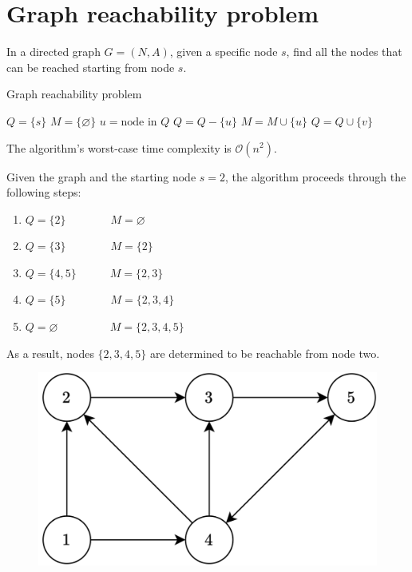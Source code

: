 \section{Graph reachability problem}

In a directed graph $G=(N,A)$, given a specific node $s$, find all the nodes that can be reached starting from node $s$.
\begin{algorithm}[H]
    \caption{Graph reachability problem}
        \begin{algorithmic}[1]
            \State $Q = \{s\}$
            \State $M = \{\varnothing\}$
                \State $u = \text{node in } Q$
                \State $Q = Q-\{u\}$
                \State $M = M \cup \{u\}$
                        \State $Q = Q \cup \{v\}$
                    \EndIf
                \EndFor
            \EndWhile
        \end{algorithmic}
\end{algorithm}
The algorithm's worst-case time complexity is $\mathcal{O}(n^2)$. 
\begin{example}
    Given the graph and the starting node $s=2$, the algorithm proceeds through the following steps:
    \begin{enumerate}
        \item $Q=\{2\} \qquad\qquad M=\varnothing$
        \item $Q=\{3\} \qquad\qquad M=\{2\}$
        \item $Q=\{4,5\} \qquad\quad  M=\{2,3\}$
        \item $Q=\{5\} \qquad\qquad M=\{2,3,4\}$
        \item $Q=\varnothing \qquad\qquad\:\:\: M=\{2,3,4,5\}$
    \end{enumerate}
    As a result, nodes $\{2,3,4,5\}$ are determined to be reachable from node two.
    \begin{figure}[H]
        \centering
        \includegraphics[width=0.3\linewidth]{images/graphs.png}
    \end{figure}
\end{example}